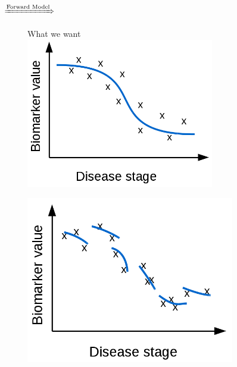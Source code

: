 \begin{figure}[h]
 \centering
 
 \par{\huge $\xRightarrow{\text{Forward Model}}$}
 
 \begin{subfigure}{0.3\textwidth}
    \centering
    What we want\\
    \vspace{1em}
    \includegraphics[width=0.90\textwidth]{images/demNewFigs/fig1.png}
    \vspace{1em}
 \end{subfigure}
 \begin{subfigure}{0.3\textwidth}
     \centering
     \vspace{1em}
     \includegraphics[width=\textwidth]{images/demNewFigs/fig2.png}

\end{subfigure}
\end{figure}

